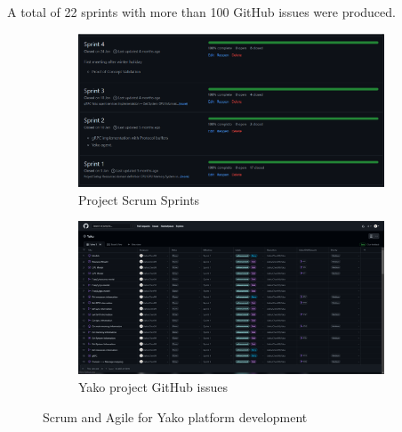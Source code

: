         A total of 22 sprints with more than 100 GitHub issues \cite{chen_yako_2022-1} were produced.
        
        \begin{figure}[H]
            \begin{subfigure}{\textwidth}
                \centering
                \includegraphics[width=0.8\linewidth]{Images/Sprints.png}
                \caption{Project Scrum Sprints}
                \label{fig:sprints}
            \end{subfigure}
            \begin{subfigure}{\textwidth}
                \centering
                \includegraphics[width=0.8\linewidth]{Images/Issues.png}
                \caption{Yako project GitHub issues}
                \label{fig:issues}
            \end{subfigure}
            \caption{Scrum and Agile for Yako platform development}
            \label{fig:scrum}
        \end{figure}